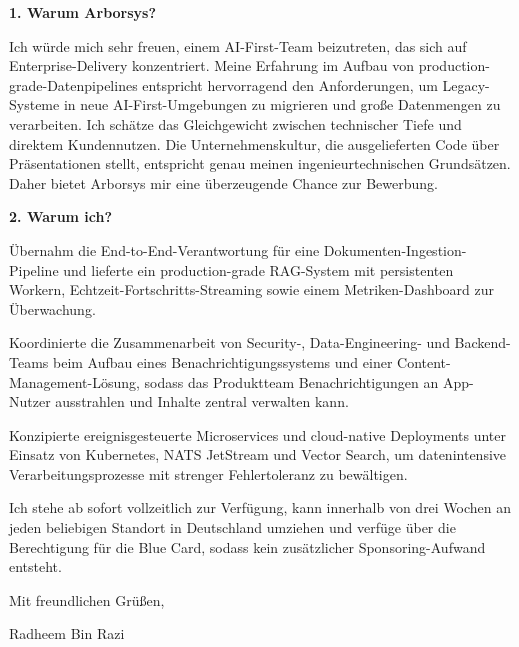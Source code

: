 \documentclass[11pt,a4paper]{coverletter}
\begin{document}
\vspace{8pt}\noindent\textbf{1. Warum Arborsys?}\par\vspace{3pt}

Ich würde mich sehr freuen, einem AI-First-Team beizutreten, das sich auf Enterprise-Delivery konzentriert. Meine Erfahrung im Aufbau von production-grade-Datenpipelines entspricht hervorragend den Anforderungen, um Legacy-Systeme in neue AI-First-Umgebungen zu migrieren und große Datenmengen zu verarbeiten. Ich schätze das Gleichgewicht zwischen technischer Tiefe und direktem Kundennutzen. Die Unternehmenskultur, die ausgelieferten Code über Präsentationen stellt, entspricht genau meinen ingenieurtechnischen Grundsätzen. Daher bietet Arborsys mir eine überzeugende Chance zur Bewerbung.

\vspace{8pt}\noindent\textbf{2. Warum ich?}\par\vspace{3pt}

\bullets

  \item Übernahm die End-to-End-Verantwortung für eine Dokumenten-Ingestion-Pipeline und lieferte ein production-grade RAG-System mit persistenten Workern, Echtzeit-Fortschritts-Streaming sowie einem Metriken-Dashboard zur Überwachung.

  \item Koordinierte die Zusammenarbeit von Security-, Data-Engineering- und Backend-Teams beim Aufbau eines Benachrichtigungssystems und einer Content-Management-Lösung, sodass das Produktteam Benachrichtigungen an App-Nutzer ausstrahlen und Inhalte zentral verwalten kann.

  \item Konzipierte ereignisgesteuerte Microservices und cloud-native Deployments unter Einsatz von Kubernetes, NATS JetStream und Vector Search, um datenintensive Verarbeitungsprozesse mit strenger Fehlertoleranz zu bewältigen.

\bulletsend

Ich stehe ab sofort vollzeitlich zur Verfügung, kann innerhalb von drei Wochen an jeden beliebigen Standort in Deutschland umziehen und verfüge über die Berechtigung für die Blue Card, sodass kein zusätzlicher Sponsoring-Aufwand entsteht.

\closing{Mit freundlichen Grüßen,}{Radheem Bin Razi}
\end{document}
